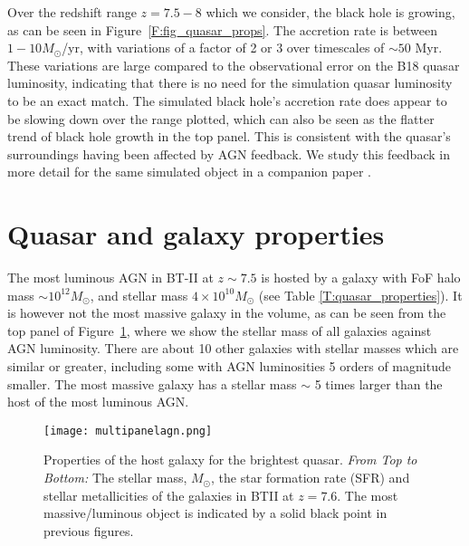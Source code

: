 \documentclass[twocolumn,useAMS,usenatbib]{mnras} \usepackage{natbib}
\newcommand{\Msun}{M_{\odot}}
\begin{document}
Over the redshift range $z=7.5-8$ which we consider, the black hole is growing,
as can be seen in Figure~\ref{F:fig_quasar_props}. The accretion rate is between
$1-10 \Msun$/yr, with variations of a factor of 2 or 3 over timescales of $\sim 50$ Myr.
These variations are large compared to the observational error on the B18 quasar 
luminosity, indicating that there is no need for the simulation quasar
luminosity to be an exact match.
The simulated black hole's accretion rate does appear to be slowing down over the range plotted, which
can also be seen as the flatter trend of black hole growth in the top panel.
This is consistent with the quasar's surroundings having been affected by 
AGN feedback. We study this feedback in more detail for the same simulated
object in a companion paper \citep{2018arXiv.xx000x}.

\section{Quasar and galaxy properties}\label{galaxy_prop}

The most luminous AGN in BT-II at $z\sim 7.5$ is hosted by a galaxy with FoF halo mass $\sim 10^{12}\Msun$, and stellar mass $4 \times 10^{10} \Msun$
(see Table \ref{T:quasar_properties}). It is however not the most massive
galaxy in the volume, as can be seen from the top panel of Figure~\ref{F:fig_gal_properties}, where we show the stellar mass of all galaxies against AGN luminosity. There are about 10 other galaxies with stellar masses
which are  similar or greater, including some with AGN luminosities 5
orders of magnitude smaller. The most massive galaxy has a stellar mass $\sim$ 5 times
larger than the host of the most luminous AGN. 
\begin{figure}
\begin{center}
\vspace{-1cm}
\texttt{[image: multipanelagn.png]}
\vspace{-0.5cm}
\caption{\label{F:fig_gal_properties} Properties of the host 
galaxy for the brightest quasar.
{\em From Top to Bottom:} 
The stellar mass, $M_\odot$,
the star formation rate (SFR) 
and stellar metallicities 
of the galaxies in BTII
at $z=7.6$. The most massive/luminous object is indicated by a solid black point in previous figures.}  
\end{center}
\end{figure}
\end{document}

